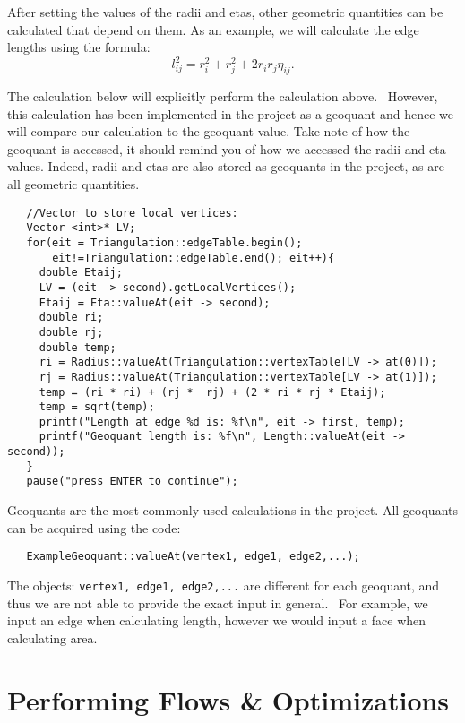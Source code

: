 \documentclass{amsart}
\theoremstyle{plain}
\numberwithin{equation}{section}
\begin{document}
\bigskip

After setting the values of the radii and etas, other geometric quantities
can be calculated that depend on them. As an example, we will calculate
the edge lengths using the formula:%
\begin{equation*}
l_{ij}^{2}=r_{i}^{2}+r_{j}^{2}+2r_{i}r_{j}\eta _{ij}.
\end{equation*}

The calculation below will explicitly perform the calculation above. \
However, this calculation has been implemented in the project as a geoquant
and hence we will compare our calculation to the geoquant value. Take note
of how the geoquant is accessed, it should remind you of how we accessed the
radii and eta values. Indeed, radii and etas are also stored as geoquants
in the project, as are all geometric quantities. \newline
\begin{verbatim}
   //Vector to store local vertices:
   Vector <int>* LV;
   for(eit = Triangulation::edgeTable.begin();
       eit!=Triangulation::edgeTable.end(); eit++){
     double Etaij;
     LV = (eit -> second).getLocalVertices();
     Etaij = Eta::valueAt(eit -> second);
     double ri;
     double rj;
     double temp;
     ri = Radius::valueAt(Triangulation::vertexTable[LV -> at(0)]);
     rj = Radius::valueAt(Triangulation::vertexTable[LV -> at(1)]);
     temp = (ri * ri) + (rj *  rj) + (2 * ri * rj * Etaij);
     temp = sqrt(temp);
     printf("Length at edge %d is: %f\n", eit -> first, temp);
     printf("Geoquant length is: %f\n", Length::valueAt(eit -> second));
   }
   pause("press ENTER to continue");
\end{verbatim}

Geoquants are the most commonly used calculations in the project. All
geoquants can be acquired using the code:\newline
\begin{verbatim}
   ExampleGeoquant::valueAt(vertex1, edge1, edge2,...);
\end{verbatim}

\bigskip

The objects: \texttt{vertex1, edge1, edge2,...} are different for each
geoquant, and thus we are not able to provide the exact input in general. \
For example, we input an edge when calculating length, however we would
input a face when calculating area. 

\section*{Performing Flows \& Optimizations}
\end{document}
